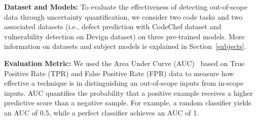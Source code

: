 %


\textbf{Dataset and Models: } To evaluate the effectiveness of detecting out-of-scope data through uncertainty quantification, we consider two code tasks and two associated datasets (i.e., defect prediction with CodeChef dataset and vulnerability detection on Devign dataset) on three pre-trained models. More information on datasets and subject models is explained in Section~\ref{subjects}.

 





\textbf{Evaluation Metric: }We used the Area Under Curve (AUC)~\cite{davis2006relationship} based on
True Positive Rate (TPR) and False Positive Rate (FPR) data to measure how effective a technique is in distinguishing an out-of-scope inputs from in-scope inputs. AUC quantifies the probability that a positive example receives a higher predictive score than a negative sample. For example, a random classifier yields an AUC of 0.5, while a perfect classifier achieves an AUC of 1.

